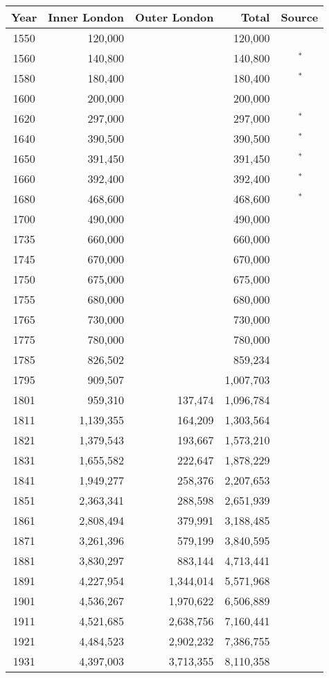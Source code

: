 \begin{tabular}{ | c | r | r | r | c |}
\hline
Year & Inner London & Outer London & Total & Source\\
\hline
1550	&120,000	&	&	120,000	&\cite{FinlShea86}\\
1560	&140,800	&	&	140,800	&\;\,\cite{FinlShea86}$^*$\\
1580	&180,400	&	&	180,400	&\;\,\cite{FinlShea86}$^*$\\
1600	&200,000	&	&	200,000	&\cite{FinlShea86}\\
1620	&297,000	&	&	297,000	&\;\,\cite{FinlShea86}$^*$\\
1640	&390,500	&	&	390,500	&\;\,\cite{FinlShea86}$^*$\\
1650	&391,450	&	&	391,450	&\;\,\cite{FinlShea86}$^*$\\
1660	&392,400	&	&	392,400	&\;\,\cite{FinlShea86}$^*$\\
1680	&468,600	&	&	468,600	&\;\,\cite{FinlShea86}$^*$\\
1700	&490,000	&	&	490,000	&\cite{FinlShea86}\\
1735	&660,000	&	&	660,000	&\cite{Land93}\\
1745	&670,000	&	&	670,000	&\cite{Land93}\\
1750	&675,000	&	&	675,000	&\cite{FinlShea86}\\
1755	&680,000	&	&	680,000	&\cite{Land93}\\
1765	&730,000	&	&	730,000	&\cite{Land93}\\
1775	&780,000	&	&	780,000	&\cite{Land93}\\
1785	&826,502	&	&	859,234	&\cite{Land93}\\
1795	&909,507	&	&	1,007,703	&\cite{Land93}\\
1801	&959,310	&137,474	&	1,096,784	&\cite{Cens}\\
1811	&1,139,355	&164,209	&	1,303,564	&\cite{Cens}\\
1821	&1,379,543	&193,667	&	1,573,210	&\cite{Cens}\\
1831	&1,655,582	&222,647	&	1,878,229	&\cite{Cens}\\
1841	&1,949,277	&258,376	&	2,207,653	&\cite{Cens}\\
1851	&2,363,341	&288,598	&	2,651,939	&\cite{Cens}\\
1861	&2,808,494	&379,991	&	3,188,485	&\cite{Cens}\\
1871	&3,261,396	&579,199	&	3,840,595	&\cite{Cens}\\
1881	&3,830,297	&883,144	&	4,713,441	&\cite{Cens}\\
1891	&4,227,954	&1,344,014	&	5,571,968	&\cite{Cens}\\
1901	&4,536,267	&1,970,622	&	6,506,889	&\cite{Cens}\\
1911	&4,521,685	&2,638,756	&	7,160,441	&\cite{Cens}\\
1921	&4,484,523	&2,902,232	&	7,386,755	&\cite{Cens}\\
1931	&4,397,003	&3,713,355	&	8,110,358	&\cite{Cens}\\
\hline
\end{tabular}
